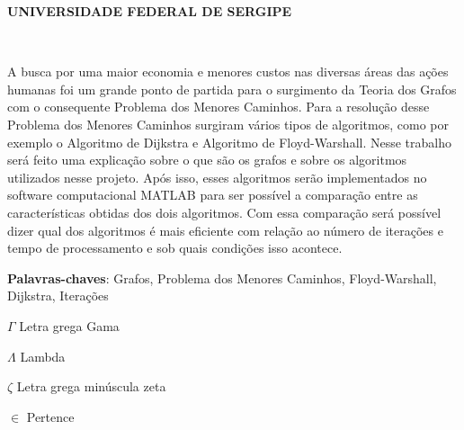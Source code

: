 \documentclass[
	12pt,				%
	openright,			%
	oneside,			%
	a4paper,			%
	english,			%
	french,				%
	spanish,			%
	brazil,				%
	]{abntex2}
\renewcommand{\imprimircapa}{%
	\begin{capa}%
		\center
		\ABNTEXchapterfont\Large \textbf{UNIVERSIDADE FEDERAL DE SERGIPE}
		\\
		\vspace*{1cm}
		{\ABNTEXchapterfont\large\imprimirautor}
		\vfill
		\begin{center}
			\ABNTEXchapterfont\bfseries\LARGE\imprimirtitulo
		\end{center}
		\vfill
		\large\imprimirlocal \\
		\large\imprimirdata
		\vspace*{1cm}
	\end{capa}
}
\begin{document}

\frenchspacing 


\imprimircapa

\imprimirfolhaderosto*



\setlength{\absparsep}{18pt} %
\begin{resumo}
	A busca por uma maior economia e menores custos nas diversas áreas das ações humanas foi um grande ponto de partida para o surgimento da Teoria dos Grafos com o consequente Problema dos Menores Caminhos. Para a resolução desse Problema dos Menores Caminhos surgiram vários tipos de algoritmos, como por exemplo o Algoritmo de Dijkstra e Algoritmo de Floyd-Warshall. Nesse trabalho será feito uma explicação sobre o que são os grafos e sobre os algoritmos utilizados nesse projeto. Após isso, esses algoritmos serão implementados no software computacional MATLAB para ser possível a comparação entre as características obtidas dos dois algoritmos. Com essa comparação será possível dizer qual dos algoritmos é mais eficiente com relação ao número de iterações e tempo de processamento e sob quais condições isso acontece.
	
	\noindent
	\textbf{Palavras-chaves}: Grafos, Problema dos Menores Caminhos, Floyd-Warshall, Dijkstra, Iterações
\end{resumo}

\listoffigures*
\pagebreak

\listoftables*
\pagebreak



\begin{simbolos}
	\item[$ \Gamma $] Letra grega Gama
	\item[$ \Lambda $] Lambda
	\item[$ \zeta $] Letra grega minúscula zeta
	\item[$ \in $] Pertence
\end{simbolos}
\end{document}
